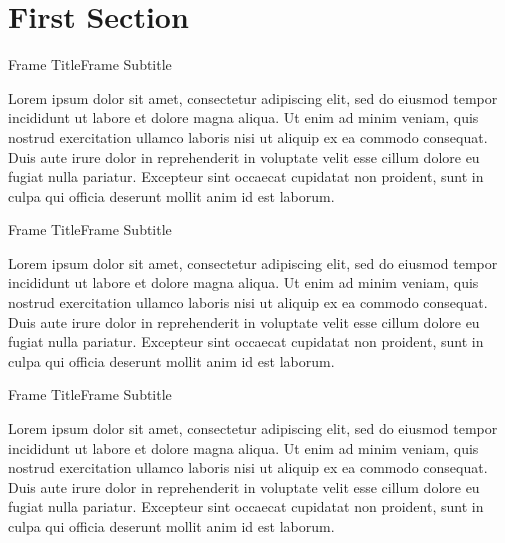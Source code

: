 \section{First Section}

\begin{frame}{Frame Title}{Frame Subtitle }

\begin{mybox}
  Lorem ipsum dolor sit amet, consectetur adipiscing elit, sed do eiusmod tempor incididunt ut labore et dolore magna aliqua. Ut enim ad minim veniam, quis nostrud exercitation ullamco laboris nisi ut aliquip ex ea commodo consequat. Duis aute irure dolor in reprehenderit in voluptate velit esse cillum dolore eu fugiat nulla pariatur. Excepteur sint occaecat cupidatat non proident, sunt in culpa qui officia deserunt mollit anim id est laborum.
\end{mybox}
    
\end{frame}

\begin{frame}{Frame Title}{Frame Subtitle }

\begin{myebox}
  Lorem ipsum dolor sit amet, consectetur adipiscing elit, sed do eiusmod tempor incididunt ut labore et dolore magna aliqua. Ut enim ad minim veniam, quis nostrud exercitation ullamco laboris nisi ut aliquip ex ea commodo consequat. Duis aute irure dolor in reprehenderit in voluptate velit esse cillum dolore eu fugiat nulla pariatur. Excepteur sint occaecat cupidatat non proident, sunt in culpa qui officia deserunt mollit anim id est laborum.
\end{myebox}
    
\end{frame}

\begin{frame}{Frame Title}{Frame Subtitle }

\begin{myabox}
  Lorem ipsum dolor sit amet, consectetur adipiscing elit, sed do eiusmod tempor incididunt ut labore et dolore magna aliqua. Ut enim ad minim veniam, quis nostrud exercitation ullamco laboris nisi ut aliquip ex ea commodo consequat. Duis aute irure dolor in reprehenderit in voluptate velit esse cillum dolore eu fugiat nulla pariatur. Excepteur sint occaecat cupidatat non proident, sunt in culpa qui officia deserunt mollit anim id est laborum.
\end{myabox}
    
\end{frame}

